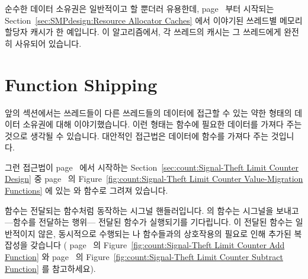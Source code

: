 순수한 데이터 소유권은 일반적이고 할 뿐더러 유용한데,
page~\pageref{sec:SMPdesign:Resource Allocator Caches} 부터 시작되는
Section~\ref{sec:SMPdesign:Resource Allocator Caches} 에서 이야기된
쓰레드별 메모리 할당자 캐시가 한 예입니다.
이 알고리즘에서, 각 쓰레드의 캐시는 그 쓰레드에게 완전히 사유되어 있습니다.
\iffalse

Pure data ownership is also both common and useful, for example, the
per-thread memory-allocator caches discussed in
Section~\ref{sec:SMPdesign:Resource Allocator Caches}
starting on
page~\pageref{sec:SMPdesign:Resource Allocator Caches}.
In this algorithm, each thread's cache is completely private to that
thread.
\fi

\section{Function Shipping}
\label{sec:owned:Function Shipping}

앞의 섹션에서는 쓰레드들이 다른 쓰레드들의 데이터에 접근할 수 있는 약한 형태의
데이터 소유권에 대해 이야기했습니다.
이런 형태는 함수에 필요한 데이터를 가져다 주는 것으로 생각될 수 있습니다.
대안적인 접근법은 데이터에 함수를 가져다 주는 것입니다.

그런 접근법이
page~\pageref{sec:count:Signal-Theft Limit Counter Design} 에서 시작하는
Section~\ref{sec:count:Signal-Theft Limit Counter Design} 중
page~\pageref{fig:count:Signal-Theft Limit Counter Value-Migration Functions}
의
Figure~\ref{fig:count:Signal-Theft Limit Counter Value-Migration Functions}
에 있는  와  함수로 그려져
있습니다.

\iffalse
The previous section described a weak form of data ownership where
threads reached out to other threads' data.
This can be thought of as bringing the data to the functions that
need it.
An alternative approach is to send the functions to the data.

Such an approach is illustrated in
Section~\ref{sec:count:Signal-Theft Limit Counter Design}
beginning on
page~\pageref{sec:count:Signal-Theft Limit Counter Design},
in particular the \co{flush_local_count_sig()} and
\co{flush_local_count()} functions in
Figure~\ref{fig:count:Signal-Theft Limit Counter Value-Migration Functions}
on
page~\pageref{fig:count:Signal-Theft Limit Counter Value-Migration Functions}.
\fi

 함수는 전달되는 함수처럼 동작하는 시그널
핸들러입니다.
 의  함수는 시그널을 보내고---함수를
전달하는 행위--- 전달된 함수가 실행되기를 기다립니다.
이 전달된 함수는 일반적이지 않은, 동시적으로 수행되는  나
 함수들과의 상호작용의 필요로 인해 추가된 복잡성을 갖습니다 (
page~\pageref{fig:count:Signal-Theft Limit Counter Add Function} 의
Figure~\ref{fig:count:Signal-Theft Limit Counter Add Function} 와
page~\pageref{fig:count:Signal-Theft Limit Counter Subtract Function} 의
Figure~\ref{fig:count:Signal-Theft Limit Counter Subtract Function} 를
참고하세요).
\iffalse

